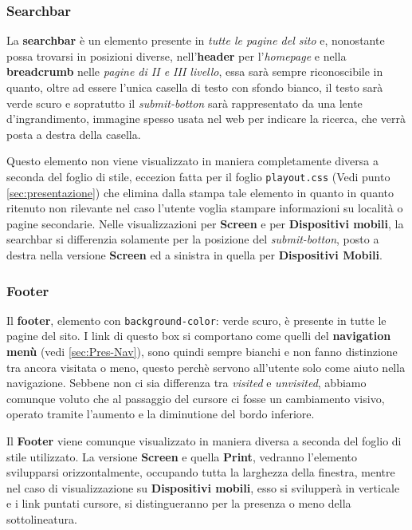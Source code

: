 \subsubsection{Searchbar}\label{sec:Pres-Searchbar}
La \textbf{searchbar} è un elemento presente in \textit{tutte le pagine del
sito} e, nonostante possa trovarsi in posizioni diverse, nell'\textbf{header}
per l'\textit{homepage} e nella \textbf{breadcrumb} nelle \textit{pagine di II
e III livello}, essa sarà sempre riconoscibile in quanto, oltre ad essere
l'unica casella di testo con sfondo bianco, il testo sarà verde scuro e
sopratutto il \textit{submit-botton} sarà rappresentato da una lente
d'ingrandimento, immagine spesso usata nel web per indicare la ricerca, che
verrà posta a destra della casella.

Questo elemento non viene visualizzato in maniera completamente diversa a
seconda del foglio di stile, eccezion fatta per il foglio \texttt{playout.css}
(Vedi punto \ref{sec:presentazione}) che elimina dalla stampa tale elemento in
quanto in quanto ritenuto non rilevante nel caso l'utente voglia stampare
informazioni su località o pagine secondarie.
Nelle visualizzazioni per \textbf{Screen} e per \textbf{Dispositivi mobili},
la searchbar si differenzia solamente per la posizione del
\textit{submit-botton}, posto a destra nella versione \textbf{Screen} ed a
sinistra in quella per \textbf{Dispositivi Mobili}.

\subsubsection{Footer}\label{sec:Pres-Footer}
Il \textbf{footer}, elemento con \texttt{background-color}: verde scuro, è
presente in tutte le pagine del sito. I link di questo box si comportano come
quelli del \textbf{navigation menù} (vedi \ref{sec:Pres-Nav}), sono quindi
sempre bianchi e non fanno distinzione tra ancora visitata o meno, questo
perchè servono all'utente solo come aiuto nella navigazione. Sebbene non ci
sia differenza tra \textit{visited} e \textit{unvisited}, abbiamo comunque
voluto che al passaggio del cursore ci fosse un cambiamento visivo, operato
tramite l'aumento e la diminutione del bordo inferiore.

Il \textbf{Footer} viene comunque visualizzato in maniera diversa a seconda
del foglio di stile utilizzato. La versione \textbf{Screen} e quella
\textbf{Print}, vedranno l'elemento svilupparsi orizzontalmente, occupando
tutta la larghezza della finestra, mentre nel caso di visualizzazione su
\textbf{Dispositivi mobili}, esso si svilupperà in verticale e i link puntati
cursore, si distingueranno per la presenza o meno della sottolineatura.

